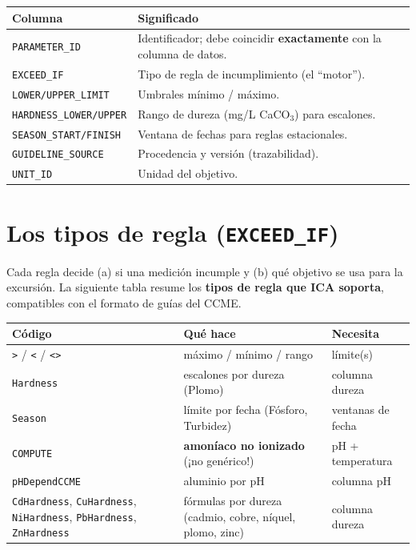 \documentclass[11pt,a4paper]{article}
\begin{document}
\begin{center}\renewcommand{\arraystretch}{1.25}
\begin{longtable}{@{}p{4.2cm} p{10.8cm}@{}}
\toprule \textbf{Columna} & \textbf{Significado} \\ \midrule\endhead
\texttt{PARAMETER\_ID} & Identificador; debe coincidir \textbf{exactamente} con la columna de datos. \\
\texttt{EXCEED\_IF} & Tipo de regla de incumplimiento (el ``motor''). \\
\texttt{LOWER/UPPER\_LIMIT} & Umbrales mínimo / máximo. \\
\texttt{HARDNESS\_LOWER/UPPER} & Rango de dureza (mg/L CaCO$_3$) para escalones. \\
\texttt{SEASON\_START/FINISH} & Ventana de fechas para reglas estacionales. \\
\texttt{GUIDELINE\_SOURCE} & Procedencia y versión (trazabilidad). \\
\texttt{UNIT\_ID} & Unidad del objetivo. \\ \bottomrule
\end{longtable}
\end{center}

\section{Los tipos de regla (\texttt{EXCEED\_IF})}
Cada regla decide (a) si una medición incumple y (b) qué objetivo se usa para la excursión. La
siguiente tabla resume los \textbf{tipos de regla que ICA soporta}, compatibles con el formato de
guías del CCME.

\begin{center}\renewcommand{\arraystretch}{1.35}
\begin{longtable}{@{}p{4.6cm} p{6.6cm} p{3.0cm}@{}}
\toprule \textbf{Código} & \textbf{Qué hace} & \textbf{Necesita} \\ \midrule\endhead
\texttt{>} / \texttt{<} / \texttt{<>} & máximo / mínimo / rango & límite(s) \\
\texttt{Hardness} & escalones por dureza (Plomo) & columna dureza \\
\texttt{Season} & límite por fecha (Fósforo, Turbidez) & ventanas de fecha \\
\texttt{COMPUTE} & \textbf{amoníaco no ionizado} (¡no genérico!) & pH + temperatura \\
\texttt{pHDependCCME} & aluminio por pH & columna pH \\
\texttt{CdHardness}, \texttt{CuHardness}, \texttt{NiHardness}, \texttt{PbHardness}, \texttt{ZnHardness} & fórmulas por dureza (cadmio, cobre, níquel, plomo, zinc) & columna dureza \\ \bottomrule
\end{longtable}
\end{center}
\end{document}
